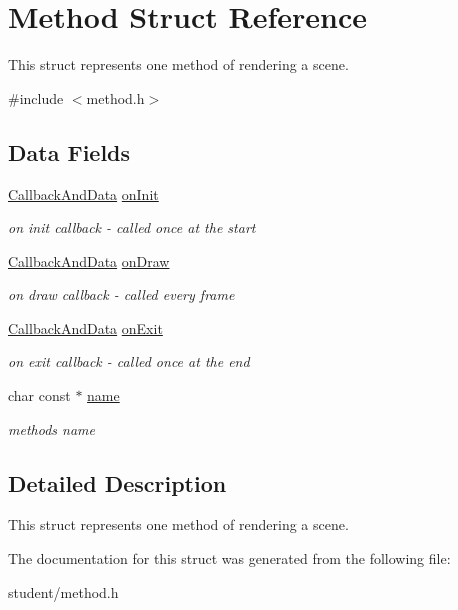 \hypertarget{structMethod}{}\section{Method Struct Reference}
\label{structMethod}


This struct represents one method of rendering a scene.  




{\ttfamily \#include $<$method.\+h$>$}

\subsection*{Data Fields}
\begin{DoxyCompactItemize}
\item 
\mbox{\label{structMethod_aaddba0e56fc557d19a98d6a09983aad6}} 
\hyperlink{structCallbackAndData}{Callback\+And\+Data} \hyperlink{structMethod_aaddba0e56fc557d19a98d6a09983aad6}{on\+Init}
\begin{DoxyCompactList}\small\item\em on init callback -\/ called once at the start \end{DoxyCompactList}\item 
\mbox{\label{structMethod_aac602b0d44dd0924ecbc1cd2bd49f22c}} 
\hyperlink{structCallbackAndData}{Callback\+And\+Data} \hyperlink{structMethod_aac602b0d44dd0924ecbc1cd2bd49f22c}{on\+Draw}
\begin{DoxyCompactList}\small\item\em on draw callback -\/ called every frame \end{DoxyCompactList}\item 
\mbox{\label{structMethod_a62d3ac9d92696fecf99fa4e02b441d72}} 
\hyperlink{structCallbackAndData}{Callback\+And\+Data} \hyperlink{structMethod_a62d3ac9d92696fecf99fa4e02b441d72}{on\+Exit}
\begin{DoxyCompactList}\small\item\em on exit callback -\/ called once at the end \end{DoxyCompactList}\item 
\mbox{\label{structMethod_aaa3bc473db253cbd522121f15781bd25}} 
char const  $\ast$ \hyperlink{structMethod_aaa3bc473db253cbd522121f15781bd25}{name}
\begin{DoxyCompactList}\small\item\em method\textquotesingle{}s name \end{DoxyCompactList}\end{DoxyCompactItemize}


\subsection{Detailed Description}
This struct represents one method of rendering a scene. 

The documentation for this struct was generated from the following file\+:\begin{DoxyCompactItemize}
\item 
student/method.\+h\end{DoxyCompactItemize}
